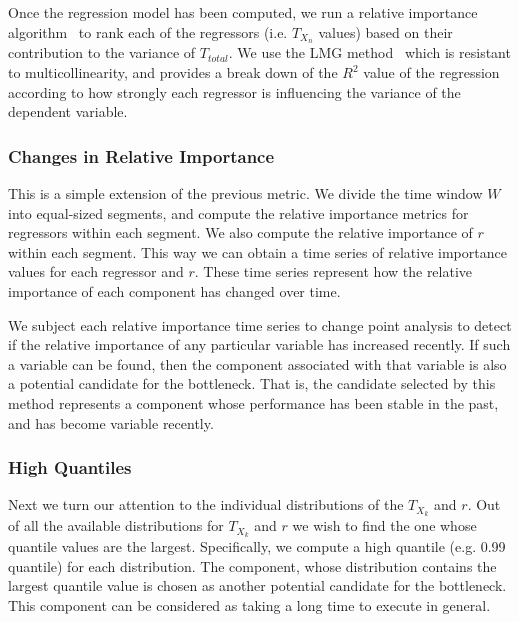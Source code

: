 Once the regression model has been computed, we run a relative importance algorithm~\cite{JSSv017i01} to rank each of the
regressors (i.e. $T_{X_n}$ values) based on their contribution to the variance of $T_{total}$. 
We use the LMG method~\cite{lmg80} which is resistant to multicollinearity, and provides a break down of the $R^2$ value of
the regression according to how strongly each regressor is influencing the variance of the dependent variable.

\subsubsection{Changes in Relative Importance}

This is a simple extension of the previous metric. We divide the time window $W$ into equal-sized segments,
and compute the relative importance metrics for regressors within each segment. We also compute the
relative importance of $r$ within each segment. This way we can
obtain a time series of relative importance values for each regressor and $r$. These time series
represent how the relative importance of each component has changed over time.

We subject each relative importance time series to change point analysis to detect if the relative importance of any particular
variable has increased recently. If such a variable can be found, then the component
associated with that variable is also a potential candidate for the bottleneck. 
That is, the candidate selected by this method represents
a component whose performance has been stable in the past, and has become variable recently. 

\subsubsection{High Quantiles}

\label{sec:highquantile}
Next we turn our attention to the individual distributions of the $T_{X_k}$ and $r$. 
Out of all the available distributions for $T_{X_k}$ and $r$
we wish to find the one whose quantile values are the largest.
Specifically, we compute a high
quantile (e.g. 0.99 quantile) for each distribution. The component, whose distribution 
contains the largest quantile value
is chosen as another potential candidate for the bottleneck. This component can be considered
as taking a long time to execute in general.

